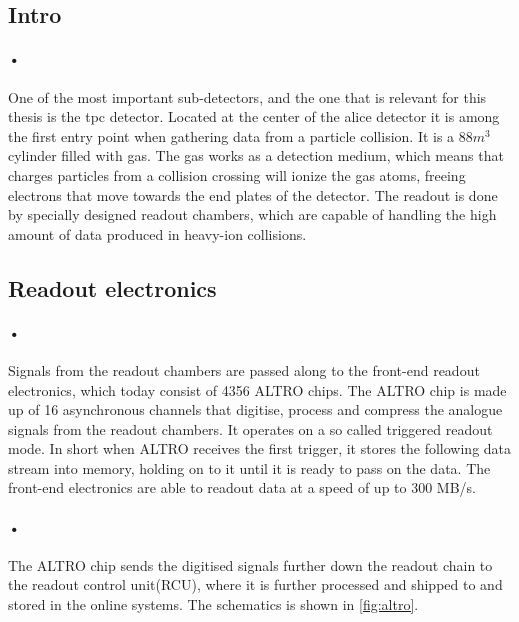 \documentclass[a4paper]{report}
\begin{document}
\subsection{Intro}
\paragraph{•}
One of the most important sub-detectors, and the one that is relevant for this thesis is the \gls{tpc} detector. 
Located at the center of the \gls{alice} detector it is among the first entry point when gathering data from a particle collision.
It is a 88\(m^3\) cylinder filled with gas.
The gas works as a detection medium, which means that charges particles from a collision crossing will ionize the gas atoms, freeing electrons that move towards the end plates of the detector.
The readout is done by specially designed readout chambers, which are capable of handling the high amount of data produced in heavy-ion collisions.

\subsection{Readout electronics} %
\paragraph{•}
Signals from the readout chambers are passed along to the front-end readout electronics, which today consist of 4356 ALTRO chips.
The ALTRO chip is made up of 16 asynchronous channels that digitise, process and compress the analogue signals from the readout chambers.
It operates on a so called triggered readout mode.
In short when ALTRO receives the first trigger, it stores the following data stream into memory, holding on to it until it is ready to pass on the data. 
The front-end electronics are able to readout data at a speed of up to 300 MB/s.
\paragraph{•} %
The ALTRO chip sends the digitised signals further down the readout chain to the readout control unit(RCU), where it is further processed and shipped to  and stored in the online systems.
The schematics is shown in \ref{fig:altro}.
\end{document}
